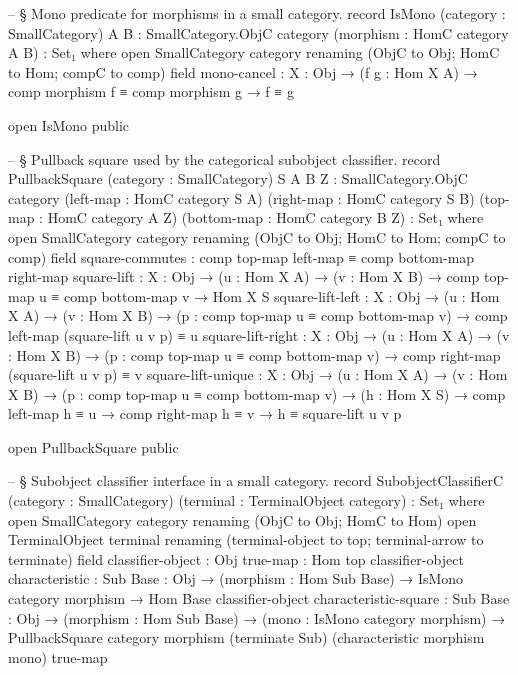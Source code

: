\documentclass[11pt]{article}
\begin{document}
\begin{code}
-- § Mono predicate for morphisms in a small category.
record IsMono
  (category : SmallCategory)
  {A B : SmallCategory.ObjC category}
  (morphism : HomC category A B) : Set₁ where
  open SmallCategory category renaming (ObjC to Obj; HomC to Hom; compC to comp)
  field
    mono-cancel : {X : Obj} →
                  (f g : Hom X A) →
                  comp morphism f ≡ comp morphism g → f ≡ g

open IsMono public

-- § Pullback square used by the categorical subobject classifier.
record PullbackSquare
  (category : SmallCategory)
  {S A B Z : SmallCategory.ObjC category}
  (left-map : HomC category S A)
  (right-map : HomC category S B)
  (top-map : HomC category A Z)
  (bottom-map : HomC category B Z) : Set₁ where
  open SmallCategory category renaming (ObjC to Obj; HomC to Hom; compC to comp)
  field
    square-commutes : comp top-map left-map ≡ comp bottom-map right-map
    square-lift     : {X : Obj} →
                      (u : Hom X A) →
                      (v : Hom X B) →
                      comp top-map u ≡ comp bottom-map v →
                      Hom X S
    square-lift-left : {X : Obj} →
                       (u : Hom X A) →
                       (v : Hom X B) →
                       (p : comp top-map u ≡ comp bottom-map v) →
                       comp left-map (square-lift u v p) ≡ u
    square-lift-right : {X : Obj} →
                        (u : Hom X A) →
                        (v : Hom X B) →
                        (p : comp top-map u ≡ comp bottom-map v) →
                        comp right-map (square-lift u v p) ≡ v
    square-lift-unique : {X : Obj} →
                         (u : Hom X A) →
                         (v : Hom X B) →
                         (p : comp top-map u ≡ comp bottom-map v) →
                         (h : Hom X S) →
                         comp left-map h ≡ u →
                         comp right-map h ≡ v →
                         h ≡ square-lift u v p

open PullbackSquare public

-- § Subobject classifier interface in a small category.
record SubobjectClassifierC
  (category : SmallCategory)
  (terminal : TerminalObject category) : Set₁ where
  open SmallCategory category renaming (ObjC to Obj; HomC to Hom)
  open TerminalObject terminal renaming
    (terminal-object to top; terminal-arrow to terminate)
  field
    classifier-object : Obj
    true-map          : Hom top classifier-object
    characteristic    : {Sub Base : Obj} →
                        (morphism : Hom Sub Base) →
                        IsMono category morphism →
                        Hom Base classifier-object
    characteristic-square : {Sub Base : Obj} →
                            (morphism : Hom Sub Base) →
                            (mono : IsMono category morphism) →
                            PullbackSquare category
                              morphism
                              (terminate Sub)
                              (characteristic morphism mono)
                              true-map


\end{code}
\end{document}
